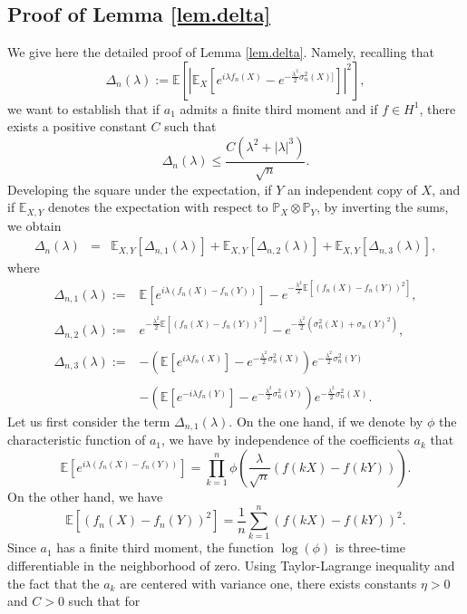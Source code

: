 \documentclass{svproc}
\newcommand \Esp {\mathbb{E}}
\begin{document}
\subsection{Proof of Lemma \ref{lem.delta}} \label{sec.appdelta}
We give here the detailed proof of Lemma \ref{lem.delta}. Namely, recalling that 
\[
\Delta_n({\lambda}):=\Esp\left[ \left|\Esp_X\left[e^{i {\lambda} f_n(X)}-e^{-\frac{{\lambda}^2}{2}\sigma_n^2(X)]}\right]\right|^2\right],
\]
we want to establish that if $a_1$ admits a finite third moment and if $f \in H^1$, there exists a positive constant $C$ such that 
\[
\Delta_n({\lambda}) \leq \frac{C ({\lambda}^2+|{\lambda}|^3)}{\sqrt{n}}.
\]
Developing the square under the expectation, if $Y$ an independent copy of $X$, and if $\mathbb E_{X,Y}$ denotes the expectation with respect to $\mathbb P_X \otimes \mathbb P_Y$, by inverting the sums, we obtain
\begin{eqnarray*}
\Delta_n({\lambda})&=&\Esp_{X,Y}\left[\Delta_{n,1}({\lambda})\right]+\Esp_{X,Y}\left[\Delta_{n,2}({\lambda})\right]+\Esp_{X,Y}\left[\Delta_{n,3}({\lambda})\right],
\end{eqnarray*}
where
\[\begin{array}{ll}
\Delta_{n,1}({\lambda}):=& \Esp[e^{i{\lambda}(f_n(X)-f_n(Y))}]-e^{-\frac{{\lambda}^2}{2}\Esp[(f_n(X)-f_n(Y))^2]},\\
\\
\Delta_{n,2}({\lambda}):=& e^{-\frac{{\lambda}^2}{2}\Esp[(f_n(X)-f_n(Y))^2]} -   e^{-\frac{{\lambda}^2}{2}(\sigma_n^2(X)+\sigma_n(Y)^2)},\\
\\
\Delta_{n,3}({\lambda}):=&-\left(\Esp\left[e^{i {\lambda} f_n(X)}\right]-e^{-\frac{{\lambda}^2}{2}\sigma_n^2(X)}\right)e^{-\frac{{\lambda}^2}{2}\sigma_n^2(Y)} \\
\\ & - \left(\Esp\left[e^{-i {\lambda} f_n(Y)}\right]-e^{-\frac{{\lambda}^2}{2}\sigma_n^2(Y)}\right)e^{-\frac{{\lambda}^2}{2}\sigma_n^2(X)}.
\end{array}\]
Let us first consider the term $\Delta_{n,1}({\lambda})$. 
On the one hand, if we denote by $\phi$ the characteristic function of $a_1$, we have by independence of the coefficients $a_k$ that
\[
\Esp[e^{i{\lambda} (f_n(X)-f_n(Y))}]=\prod_{k=1}^{n}\phi\left(\frac{{\lambda}}{\sqrt{n}} (f(kX)-f(kY))\right).
\]
On the other hand, we have 
\[
\Esp[(f_n(X)-f_n(Y))^2] = \frac{1}{n}\sum_{k=1}^{n}(f(kX)-f(kY))^2.
\]
Since $a_1$ has a finite third moment, the function $\log(\phi)$ is three-time differentiable in the neighborhood of zero. Using Taylor-Lagrange inequality and the fact that the $a_k$ are centered with variance one, there exists constants $\eta>0$ and $C>0$ such that for 
\end{document}
